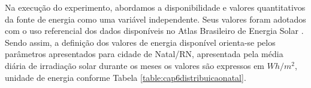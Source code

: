 Na execução do experimento, abordamos a disponibilidade e valores quantitativos da fonte de energia como uma variável independente. Seus valores foram adotados com o uso referencial dos dados disponíveis no Atlas Brasileiro de Energia Solar \cite{martins2017atlas}. Sendo assim, a definição dos valores de energia disponível orienta-se pelos parâmetros apresentados para cidade de Natal/RN, apresentada pela média diária de irradiação solar durante os meses os valores são expressos em $Wh/m^2$, unidade de energia conforme Tabela \ref{table:cap6distribuicaonatal}.

\begingroup

\setlength{\tabcolsep}{10pt} %
\renewcommand{\arraystretch}{1.5} %

\begin{table}[h]
	

\end{table}

